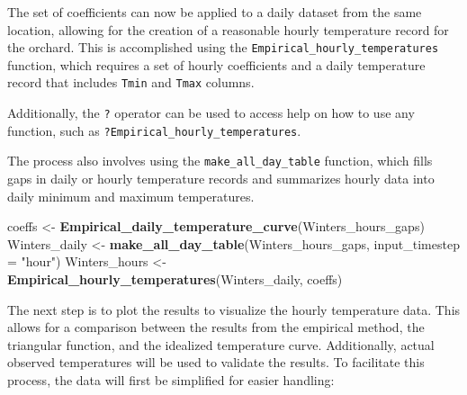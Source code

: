 \documentclass[
]{article}
\newenvironment{Shaded}{\begin{snugshade}}{\end{snugshade}}
\newcommand{\AttributeTok}[1]{\textcolor[rgb]{0.13,0.29,0.53}{#1}}
\newcommand{\FloatTok}[1]{\textcolor[rgb]{0.00,0.00,0.81}{#1}}
\newcommand{\FunctionTok}[1]{\textcolor[rgb]{0.13,0.29,0.53}{\textbf{#1}}}
\newcommand{\NormalTok}[1]{#1}
\newcommand{\OtherTok}[1]{\textcolor[rgb]{0.56,0.35,0.01}{#1}}
\newcommand{\SpecialCharTok}[1]{\textcolor[rgb]{0.81,0.36,0.00}{\textbf{#1}}}
\newcommand{\StringTok}[1]{\textcolor[rgb]{0.31,0.60,0.02}{#1}}
\begin{document}
The set of coefficients can now be applied to a daily dataset from the same location, allowing for the creation of a reasonable hourly temperature record for the orchard. This is accomplished using the \texttt{Empirical\_hourly\_temperatures} function, which requires a set of hourly coefficients and a daily temperature record that includes \texttt{Tmin} and \texttt{Tmax} columns.

Additionally, the \texttt{?} operator can be used to access help on how to use any function, such as \texttt{?Empirical\_hourly\_temperatures}.

The process also involves using the \texttt{make\_all\_day\_table} function, which fills gaps in daily or hourly temperature records and summarizes hourly data into daily minimum and maximum temperatures.

\begin{Shaded}
\begin{Highlighting}[]
\NormalTok{coeffs }\OtherTok{\textless{}{-}} \FunctionTok{Empirical\_daily\_temperature\_curve}\NormalTok{(Winters\_hours\_gaps)}
\NormalTok{Winters\_daily }\OtherTok{\textless{}{-}}
  \FunctionTok{make\_all\_day\_table}\NormalTok{(Winters\_hours\_gaps, }\AttributeTok{input\_timestep =} \StringTok{"hour"}\NormalTok{)}
\NormalTok{Winters\_hours }\OtherTok{\textless{}{-}} \FunctionTok{Empirical\_hourly\_temperatures}\NormalTok{(Winters\_daily, coeffs)}
\end{Highlighting}
\end{Shaded}

The next step is to plot the results to visualize the hourly temperature data. This allows for a comparison between the results from the empirical method, the triangular function, and the idealized temperature curve. Additionally, actual observed temperatures will be used to validate the results. To facilitate this process, the data will first be simplified for easier handling:

\begin{Shaded}
\end{Shaded}
\end{document}

